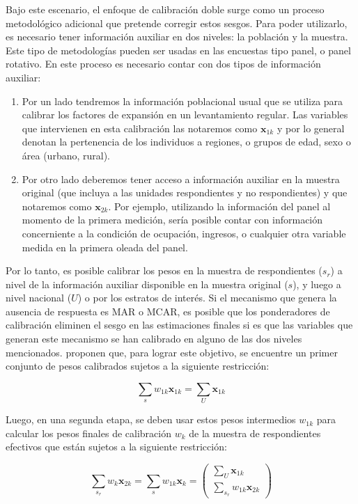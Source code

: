 \documentclass[
  12pt,
  spanish,
]{book}
\providecommand{\tightlist}{%
  \setlength{\itemsep}{0pt}\setlength{\parskip}{0pt}}
\begin{document}
Bajo este escenario, el enfoque de calibración doble surge como un proceso metodológico adicional que pretende corregir estos sesgos. Para poder utilizarlo, es necesario tener información auxiliar en dos niveles: la población y la muestra. Este tipo de metodologías pueden ser usadas en las encuestas tipo panel, o panel rotativo. En este proceso es necesario contar con dos tipos de información auxiliar:

\begin{enumerate}
\def\labelenumi{\arabic{enumi}.}
\tightlist
\item
  Por un lado tendremos la información poblacional usual que se utiliza para calibrar los factores de expansión en un levantamiento regular. Las variables que intervienen en esta calibración las notaremos como \(\boldsymbol{x}_{1k}\) y por lo general denotan la pertenencia de los individuos a regiones, o grupos de edad, sexo o área (urbano, rural).
\item
  Por otro lado deberemos tener acceso a información auxiliar en la muestra original (que incluya a las unidades respondientes y no respondientes) y que notaremos como \(\boldsymbol{x}_{2k}\). Por ejemplo, utilizando la información del panel al momento de la primera medición, sería posible contar con información concerniente a la condición de ocupación, ingresos, o cualquier otra variable medida en la primera oleada del panel.
\end{enumerate}

Por lo tanto, es posible calibrar los pesos en la muestra de respondientes (\(s_r\)) a nivel de la información auxiliar disponible en la muestra original (\(s\)), y luego a nivel nacional (\(U\)) o por los estratos de interés. Si el mecanismo que genera la ausencia de respuesta es MAR o MCAR, es posible que los ponderadores de calibración eliminen el sesgo en las estimaciones finales si es que las variables que generan este mecanismo se han calibrado en alguno de las dos niveles mencionados. \citet{Sarndal_Lundstrom_2006} proponen que, para lograr este objetivo, se encuentre un primer conjunto de pesos calibrados sujetos a la siguiente restricción:

\[
\sum_{s}w_{1k}\boldsymbol{x}_{1k} = \sum_{U}\boldsymbol{x}_{1k}
\]

Luego, en una segunda etapa, se deben usar estos pesos intermedios \(w_{1k}\) para calcular los pesos finales de calibración \(w_{k}\) de la muestra de respondientes efectivos que están sujetos a la siguiente restricción:

\[
\sum_{s_r}w_{k}\boldsymbol{x}_{2k} = \sum_{s}w_{1k}\boldsymbol{x}_{k} = 
\begin{pmatrix}
\sum_{U}\boldsymbol{x}_{1k}\\
\sum_{s_r}w_{1k}\boldsymbol{x}_{2k}
\end{pmatrix}
\]
\end{document}
